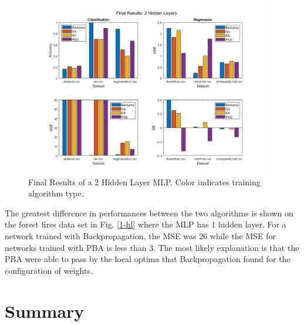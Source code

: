 \documentclass[twoside,11pt]{article}
\begin{document}
	\begin{figure}[h]
		\centering
		\includegraphics[height=3in]{FINAL_FIGS/2_hl.jpg}
		\caption{Final Results of a 2 Hidden Layer MLP. Color indicates training algorithm type.}
		\label{2-hl}
	\end{figure}

	The greatest difference in performances between the two algorithms is shown on the forest fires data set in Fig. \ref{1-hl} where the MLP has 1 hidden layer. 
	For a network trained with Backpropagation, the MSE was 26 while the MSE for networks trained with PBA is less than 3. 
	The most likely explanation is that the PBA were able to pass by the local optima that Backpropagation found for the configuration of weights.

\section{Summary}

\newpage


\end{document}
